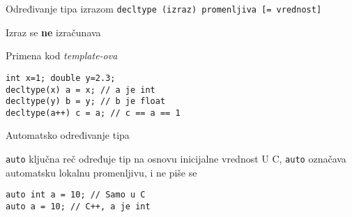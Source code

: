 \documentclass{article}
\newenvironment{xitemize}{%
    
    \itemize
    \larger
}{%
    \enditemize
}
\let\olditemize\itemize
\let\endolditemize\enditemize
\renewenvironment{itemize}{%
    \smaller
    \olditemize
}{%
    \endolditemize
}
\providecommand{\inlinecode}[1]{\texttt{#1}}
\begin{document}
\begin{xitemize}
\begin{multicols}{2}
\item Određivanje tipa izrazom\newline
\inlinecode{decltype (izraz) promenljiva [= vrednost]}
\begin{itemize}
    \item Izraz se \textbf{ne} izračunava
    \item Primena kod \textit{template-ova}
\end{itemize}
\columnbreak
\begin{lstlisting}
int x=1; double y=2.3;
decltype(x) a = x; // a je int
decltype(y) b = y; // b je float
decltype(a++) c = a; // c == a == 1
\end{lstlisting}
\end{multicols}
\item Automatsko određivanje tipa
\begin{itemize}
    \item \inlinecode{auto} ključna reč određuje tip na osnovu inicijalne vrednost 
    U C, \inlinecode{auto} označava automatsku lokalnu promenljivu, i ne piše se
    
    \begin{lstlisting}
auto int a = 10; // Samo u C
auto a = 10; // C++, a je int
\end{lstlisting}
\end{itemize}


\end{xitemize}
\end{document}
